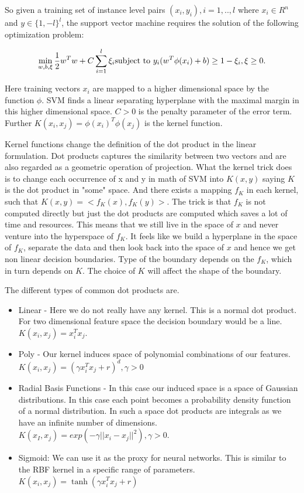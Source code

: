 \documentclass{book}
\begin{document}
So given a training set of instance level pairs $(x_i, y_i), i = 1, .., l$ where $x_i \in R^n$ and $y \in \{1, -l\}^l$, the support vector machine requires the solution of the following optimization problem:

\begin{equation}
	\min_{w, b, \xi} \frac{1}{2}w^Tw + C \sum_{i=1}^{l} \xi_i \\
	\text{subject to } y_i(w^T \phi(x_i) + b) \geq 1 - \xi_i, \xi \geq 0.
\end{equation}

Here training vectors $x_i$ are mapped to a higher dimensional space by the function $\phi$. SVM finds a linear separating hyperplane with the maximal margin in this higher dimensional space. $C>0$ is the penalty parameter of the error term. Further $K(x_i, x_j) = \phi(x_i)^T\phi(x_j)$ is the kernel function.

Kernel functions change the definition of the dot product in the linear formulation. Dot products captures the similarity between two vectors and are also regarded as a geometric operation of projection. What the kernel trick does is to change each occurrence  of x and y in math of SVM into $K(x, y)$ saying $K$ is the dot product in "some" space. And there exists a mapping $f_K$ in each kernel, such that $K(x, y)=<f_K(x), f_K(y)>$. The trick is that $f_K$ is not computed directly but just the dot products are computed which saves a lot of time and resources. This means that we still live in the space of $x$ and never venture into the hyperspace of $f_K$. It feels like we build a hyperplane in the space of $f_K$, separate the data and then look back into the space of $x$ and hence we get non linear decision boundaries. Type of the boundary depends on the $f_K$, which in turn depends on $K$. The choice of $K$ will affect the shape of the boundary.

The different types of common dot products are.

\begin{itemize}
	\item Linear - Here we do not really have any kernel. This is a normal dot product. For two dimensional feature space the decision boundary would be a line. $K(x_i, x_j) = x_i^Tx_j$.
	\item Poly - Our kernel induces space of polynomial combinations of our features. $K(x_i, x_j) = (\gamma x_i^Tx_j + r)^d, \gamma > 0$
	\item Radial Basis Functions - In this case our induced space is a space of Gaussian distributions. In this case each point becomes a probability density function of a normal distribution. In such a space dot products are integrals as we have an infinite number of dimensions. $K(x_I, x_j) = exp(-\gamma || x_i -x_j ||^2), \gamma > 0$.
	\item Sigmoid: We can use it as the proxy for neural networks. This is similar to the RBF kernel in a specific range of parameters\cite{WEBSITE:18}. $K(x_i, x_j) = \tanh(\gamma x_i^Tx_j + r)$
\end{itemize}
\end{document}
